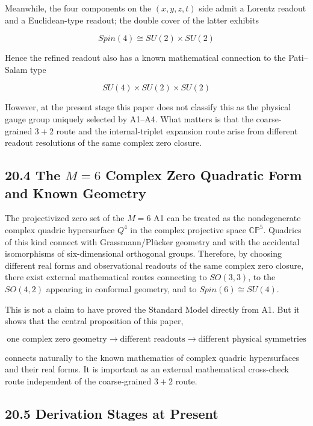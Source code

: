 \documentclass[
  a4paper,
]{article}
\begin{document}
Meanwhile, the four components on the \((x,y,z,t)\) side admit a Lorentz
readout and a Euclidean-type readout; the double cover of the latter
exhibits

\[
Spin(4)\cong SU(2)\times SU(2)
\]

Hence the refined readout also has a known mathematical connection to
the Pati--Salam type

\[
SU(4)\times SU(2)\times SU(2)
\]

However, at the present stage this paper does not classify this as the
physical gauge group uniquely selected by A1--A4. What matters is that
the coarse-grained \(3+2\) route and the internal-triplet expansion
route arise from different readout resolutions of the same complex zero
closure.

\subsection{\texorpdfstring{20.4 The \(M=6\) Complex Zero Quadratic Form
and Known
Geometry}{20.4 The M=6 Complex Zero Quadratic Form and Known Geometry}}\label{the-m6-complex-zero-quadratic-form-and-known-geometry}

The projectivized zero set of the \(M=6\) A1 can be treated as the
nondegenerate complex quadric hypersurface \(Q^4\) in the complex
projective space \(\mathbb{CP}^5\). Quadrics of this kind connect with
Grassmann/Plücker geometry and with the accidental isomorphisms of
six-dimensional orthogonal groups. Therefore, by choosing different real
forms and observational readouts of the same complex zero closure, there
exist external mathematical routes connecting to \(SO(3,3)\), to the
\(SO(4,2)\) appearing in conformal geometry, and to
\(Spin(6)\cong SU(4)\).

This is not a claim to have proved the Standard Model directly from A1.
But it shows that the central proposition of this paper,

\[
\boxed{\text{one complex zero geometry}\longrightarrow\text{different readouts}\longrightarrow\text{different physical symmetries}}
\]

connects naturally to the known mathematics of complex quadric
hypersurfaces and their real forms. It is important as an external
mathematical cross-check route independent of the coarse-grained \(3+2\)
route.

\subsection{20.5 Derivation Stages at
Present}\label{derivation-stages-at-present}
\end{document}
